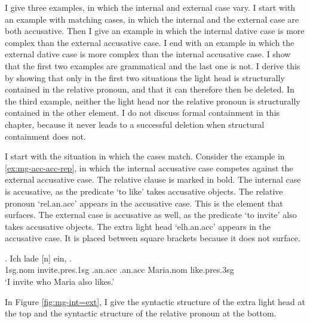 I give three examples, in which the internal and external case vary.
I start with an example with matching cases, in which the internal and the external case are both accusative.
Then I give an example in which the internal dative case is more complex than the external accusative case.
I end with an example in which the external dative case is more complex than the internal accusative case.
I show that the first two examples are grammatical and the last one is not. I derive this by showing that only in the first two situations the light head is structurally contained in the relative pronoun, and that it can therefore then be deleted.
In the third example, neither the light head nor the relative pronoun is structurally contained in the other element.
I do not discuss formal containment in this chapter, because it never leads to a successful deletion when structural containment does not.

I start with the situation in which the cases match.
Consider the example in \ref{ex:mg-acc-acc-rep}, in which the internal accusative case competes against the external accusative case. The relative clause is marked in bold.
The internal case is accusative, as the predicate  `to like' takes accusative objects. The relative pronoun  `\ac{rel}.\ac{an}.\ac{acc}' appears in the accusative case. This is the element that surfaces.
The external case is accusative as well, as the predicate  `to invite' also takes accusative objects. The extra light head  `\ac{elh}.\ac{an}.\ac{acc}' appears in the accusative case. It is placed between square brackets because it does not surface.

\exg. Ich lade [n] ein,    .\\
 1\ac{sg}.\ac{nom} invite.\ac{pres}.1\ac{sg}\scsub{[acc]} .\ac{an}.\ac{acc} {} .\ac{an}.\ac{acc} Maria.\ac{nom} like.\ac{pres}.3\ac{sg}\scsub{[acc]}\\
 `I invite who Maria also likes.' \label{ex:mg-acc-acc-rep}

In Figure \ref{fig:mg-int=ext}, I give the syntactic structure of the extra light head at the top and the syntactic structure of the relative pronoun at the bottom.


